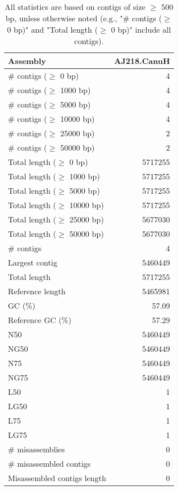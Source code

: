 \documentclass[12pt,a4paper]{article}
\begin{document}
\begin{table}[ht]
\begin{center}
\caption{All statistics are based on contigs of size $\geq$ 500 bp, unless otherwise noted (e.g., "\# contigs ($\geq$ 0 bp)" and "Total length ($\geq$ 0 bp)" include all contigs).}
\begin{tabular}{|l*{1}{|r}|}
\hline
Assembly & AJ218.CanuH \\ \hline
\# contigs ($\geq$ 0 bp) & 4 \\ \hline
\# contigs ($\geq$ 1000 bp) & 4 \\ \hline
\# contigs ($\geq$ 5000 bp) & 4 \\ \hline
\# contigs ($\geq$ 10000 bp) & 4 \\ \hline
\# contigs ($\geq$ 25000 bp) & 2 \\ \hline
\# contigs ($\geq$ 50000 bp) & 2 \\ \hline
Total length ($\geq$ 0 bp) & 5717255 \\ \hline
Total length ($\geq$ 1000 bp) & 5717255 \\ \hline
Total length ($\geq$ 5000 bp) & 5717255 \\ \hline
Total length ($\geq$ 10000 bp) & 5717255 \\ \hline
Total length ($\geq$ 25000 bp) & 5677030 \\ \hline
Total length ($\geq$ 50000 bp) & 5677030 \\ \hline
\# contigs & 4 \\ \hline
Largest contig & 5460449 \\ \hline
Total length & 5717255 \\ \hline
Reference length & 5465981 \\ \hline
GC (\%) & 57.09 \\ \hline
Reference GC (\%) & 57.29 \\ \hline
N50 & 5460449 \\ \hline
NG50 & 5460449 \\ \hline
N75 & 5460449 \\ \hline
NG75 & 5460449 \\ \hline
L50 & 1 \\ \hline
LG50 & 1 \\ \hline
L75 & 1 \\ \hline
LG75 & 1 \\ \hline
\# misassemblies & 0 \\ \hline
\# misassembled contigs & 0 \\ \hline
Misassembled contigs length & 0 \\ \hline

\end{tabular}
\end{center}
\end{table}
\end{document}
